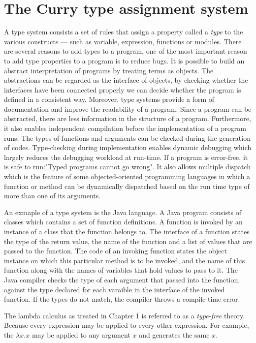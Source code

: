 \chapter{The Curry type assignment system}

A type system consists a set of rules that assign a property called a \textit{type} to the various constructs --- such as variable, expression, functions or modules. There are several reasons to add types to a program, one of the most important reason to add type properties to a program is to reduce bugs. It is possible to build an abstract interpretation of programs by treating terms as objects. The abstractions can be regarded as the interface of objects, by checking whether the interfaces have been connected properly we can decide whether the program is defined in a consistent way. Moreover, type systems provide a form of documentation and improve the readability of a program. Since a program can be abstracted, there are less information in the structure of a program. Furthermore, it also enables independent compilation before the implementation of a program runs. The types of functions and arguments can be checked during the generation of codes. Type-checking during implementation enables dynamic  debugging which largely reduces the debugging workload at run-time. If a program is error-free, it is safe to run:"Typed programs cannot go wrong". It also allows multiple dispatch which is the feature of some objected-oriented programming languages in which a function or method can be dynamically dispatched based on the run time type of more than one of its arguments.
 
An exmaple of a type system is the Java language. A Java program consists of classes which contains a set of function definitions. A function is invoked by an instance of a class that the function belongs to. The interface of a function states the type of the return value, the name of the function and a list of values that are passed to the function. The code of an invoking function states the object instance on which this particular method is to be invoked, and the name of this function along with the names of variables that hold values to pass to it. The Java compiler checks the type of each argument that passed into the function, against the type declared for each varaible in the interface of the invoked function. If the types do not match, the compiler throws a compile-time error.

The lambda calculus as treated in Chapter 1 is referred to as a \textit{type-free} theory. Because every expression may be applied to every other expression. For example, the $\lambda x.x$ may be applied to any argument $x$ and generates the same $x$. 

